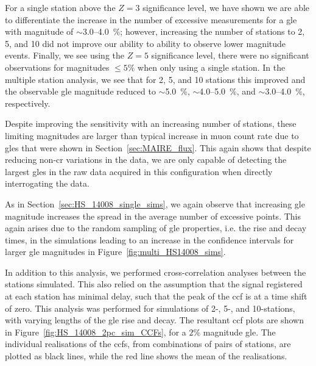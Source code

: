 For a single station above the $Z=3$ significance level, we have shown we are able to differentiate the increase in the number of excessive measurements for a \gls{gle} with magnitude of $\sim$3.0--4.0~\%; however, increasing the number of stations to 2, 5, and 10 did not improve our ability to ability to observe lower magnitude events. Finally, we see using the $Z=5$ significance level, there were no significant observations for magnitudes $\leq 5\%$ when only using a single station. In the multiple station analysis, we see that for 2, 5, and 10 stations this improved and the observable \gls{gle} magnitude reduced to $\sim$5.0~\%, $\sim$4.0--5.0~\%, and $\sim$3.0--4.0~\%, respectively. 

Despite improving the sensitivity with an increasing number of stations, these limiting magnitudes are larger than typical increase in muon count rate due to \glspl{gle} that were shown in Section~\ref{sec:MAIRE_flux}. This again shows that despite reducing non-\gls{cr} variations in the data, we are only capable of detecting the largest \glspl{gle} in the raw data acquired in this configuration when directly interrogating the data.

As in Section~\ref{sec:HS_14008_single_sims}, we again observe that increasing \gls{gle} magnitude increases the spread in the average number of excessive points. This again arises due to the random sampling of \gls{gle} properties, i.e. the rise and decay times, in the simulations leading to an increase in the confidence intervals for larger \gls{gle} magnitudes in Figure~\ref{fig:multi_HS14008_sims}.


In addition to this analysis, we performed cross-correlation analyses between the stations simulated. This also relied on the assumption that the signal registered at each station has minimal delay, such that the peak of the \gls{ccf} is at a time shift of zero. This analysis was performed for simulations of 2-, 5-, and 10-stations, with varying lengths of the \gls{gle} rise and decay. The resultant \gls{ccf} plots are shown in Figure~\ref{fig:HS_14008_2pc_sim_CCFs}, for a $2 \%$ magnitude \gls{gle}. The individual realisations of the \glspl{ccf}, from combinations of pairs of stations, are plotted as black lines, while the red line shows the mean of the realisations.


